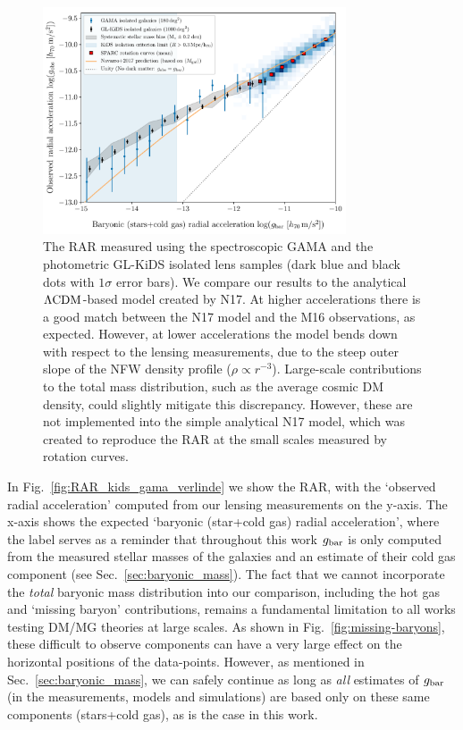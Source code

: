 \documentclass[usenatbib]{mnras}
\newcommand{\lcdm}{{\rm \Lambda CDM}}
\newcommand{\un}[1]{_{\rm #1}}
\begin{document}
\begin{figure}
	\includegraphics[width=0.8\textwidth]{Figures/RAR_KiDS+GAMA+Navarro_Nobins_isolated.pdf}
	\caption{The RAR measured using the spectroscopic GAMA and the photometric GL-KiDS isolated lens samples (dark blue and black dots with $1\sigma$ error bars). We compare our results to the analytical $\lcdm$-based model created by N17. At higher accelerations there is a good match between the N17 model and the M16 observations, as expected. However, at lower accelerations the model bends down with respect to the lensing measurements, due to the steep outer slope of the NFW density profile ($\rho \propto r^{-3}$). Large-scale contributions to the total mass distribution, such as the average cosmic DM density, could slightly mitigate this discrepancy. However, these are not implemented into the simple analytical N17 model, which was created to reproduce the RAR at the small scales measured by rotation curves.}
	\label{fig:RAR_kids_gama_Navarro}
\end{figure}

In Fig.~\ref{fig:RAR_kids_gama_verlinde} we show the RAR, with the `observed radial acceleration' computed from our lensing measurements on the y-axis. The x-axis shows the expected `baryonic (star+cold gas) radial acceleration', where the label serves as a reminder that throughout this work $g\un{bar}$ is only computed from the measured stellar masses of the galaxies and an estimate of their cold gas component (see Sec.~\ref{sec:baryonic_mass}). The fact that we cannot incorporate the \emph{total} baryonic mass distribution into our comparison, including the hot gas and `missing baryon' contributions, remains a fundamental limitation to all works testing DM/MG theories at large scales. As shown in Fig.~\ref{fig:missing-baryons}, these difficult to observe components can have a very large effect on the horizontal positions of the data-points. However, as mentioned in Sec.~\ref{sec:baryonic_mass}, we can safely continue as long as \emph{all} estimates of $g\un{bar}$ (in the measurements, models and simulations) are based only on these same components (stars+cold gas), as is the case in this work.
\end{document}
